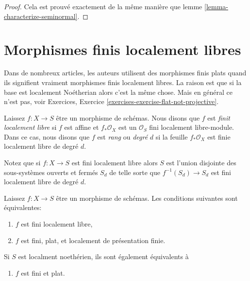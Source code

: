 \begin{proof}
Cela est prouvé exactement de la même manière que lemme \ref{lemma-characterize-seminormal}.
\end{proof}





\section{Morphismes finis localement libres}
\label{section-finite-locally-free}

\noindent
Dans de nombreux articles, les auteurs utilisent des morphismes finis plats quand ils signifient vraiment morphismes finis localement libres. La raison est que si la base est localement Noétherian alors c'est la même chose. Mais en général ce n'est pas, voir Exercices, Exercice \ref{exercises-exercise-flat-not-projective}.

\begin{definition}

\label{definition-finite-locally-free}
Laissez $f : X \to S$ être un morphisme de schémas. Nous disons que $f$ est {\it finit localement libre} si $f$ est affine et $f_*\mathcal{O}_X$ est un $\mathcal{O}_S$ fini localement libre-module. Dans ce cas, nous disons que $f$ est {\it rang} ou {\it degré} $d$ si la feuille $f_*\mathcal{O}_X$ est finie localement libre de degré $d$.
\end{definition}

\noindent
Notez que si $f : X \to S$ est fini localement libre alors $S$ est l'union disjointe des sous-systèmes ouverts et fermés $S_d$ de telle sorte que $f^{-1}(S_d) \to S_d$ est fini localement libre de degré $d$.

\begin{lemma}

\label{lemma-finite-flat}
Laissez $f : X \to S$ être un morphisme de schémas. Les conditions suivantes sont équivalentes:
\begin{enumerate}
\item $f$ est fini localement libre,
\item $f$ est fini, plat, et localement de présentation finie.
\end{enumerate}
Si $S$ est localment noethérien, ils sont également équivalents à
\begin{enumerate}
\item[(3)] $f$ est fini et plat.
\end{enumerate}

\end{lemma}

